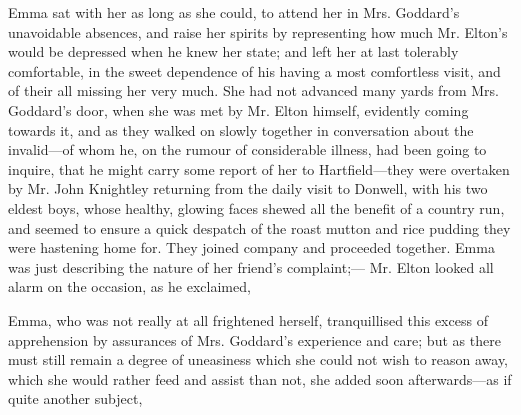 Emma sat with her as long as she could, to attend her in Mrs. Goddard's unavoidable absences, and raise her spirits by representing how much Mr. Elton's would be depressed when he knew her state; and left her at last tolerably comfortable, in the sweet dependence of his having a most comfortless visit, and of their all missing her very much. She had not advanced many yards from Mrs. Goddard's door, when she was met by Mr. Elton himself, evidently coming towards it, and as they walked on slowly together in conversation about the invalid---of whom he, on the rumour of considerable illness, had been going to inquire, that he might carry some report of her to Hartfield---they were overtaken by Mr. John Knightley returning from the daily visit to Donwell, with his two eldest boys, whose healthy, glowing faces shewed all the benefit of a country run, and seemed to ensure a quick despatch of the roast mutton and rice pudding they were hastening home for. They joined company and proceeded together. Emma was just describing the nature of her friend's complaint;--- Mr. Elton looked all alarm on the occasion, as he exclaimed,


Emma, who was not really at all frightened herself, tranquillised this excess of apprehension by assurances of Mrs. Goddard's experience and care; but as there must still remain a degree of uneasiness which she could not wish to reason away, which she would rather feed and assist than not, she added soon afterwards---as if quite another subject,


